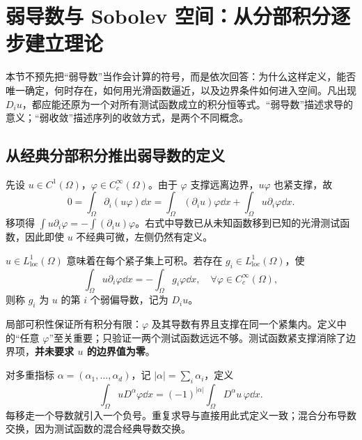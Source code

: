 \clearpage
\section{弱导数与 Sobolev 空间：从分部积分逐步建立理论}\label{sec:sobolev-definition}

本节不预先把“弱导数”当作会计算的符号，而是依次回答：为什么这样定义，能否唯一确定，何时存在，如何用光滑函数逼近，以及边界条件如何进入空间。凡出现 $D_i u$，都应能还原为一个对所有测试函数成立的积分恒等式。“弱导数”描述求导的意义；“弱收敛”描述序列的收敛方式，是两个不同概念。

\subsection{从经典分部积分推出弱导数的定义}

先设 $u\in C^1(\Omega)$，$\varphi\in C_c^\infty(\Omega)$。由于 $\varphi$ 支撑远离边界，$u\varphi$ 也紧支撑，故
\[
 0=\int_\Omega\partial_i(u\varphi)\dd x
  =\int_\Omega(\partial_i u)\varphi\dd x
   +\int_\Omega u\partial_i\varphi\dd x.
\]
移项得 $\int u\partial_i\varphi=-\int(\partial_i u)\varphi$。右式中导数已从未知函数移到已知的光滑测试函数，因此即使 $u$ 不经典可微，左侧仍然有定义。

\begin{definition}\label{def:weak-derivative}
$u\in L^1_{\mathrm{loc}}(\Omega)$ 意味着在每个紧子集上可积。若存在 $g_i\in L^1_{\mathrm{loc}}(\Omega)$，使
\begin{equation}
 \boxed{\int_\Omega u\partial_i\varphi\dd x
       =-\int_\Omega g_i\varphi\dd x,
       \quad\forall\varphi\in C_c^\infty(\Omega),}
 \label{eq:weak-derivative-definition}
\end{equation}
则称 $g_i$ 为 $u$ 的第 $i$ 个弱偏导数，记为 $D_i u$。
\end{definition}

局部可积性保证所有积分有限：$\varphi$ 及其导数有界且支撑在同一个紧集内。定义中的“任意 $\varphi$”至关重要；只验证一两个测试函数远远不够。测试函数紧支撑消除了边界项，\textbf{并未要求 $u$ 的边界值为零}。

对多重指标 $\alpha=(\alpha_1,\ldots,\alpha_d)$，记 $|\alpha|=\sum_i\alpha_i$，定义
\begin{equation}
 \int_\Omega uD^\alpha\varphi\dd x
 =(-1)^{|\alpha|}\int_\Omega D^\alpha u\,\varphi\dd x.
 \label{eq:weak-higher-derivative}
\end{equation}
每移走一个导数就引入一个负号。重复求导与直接用此式定义一致；混合分布导数交换，因为测试函数的混合经典导数交换。

